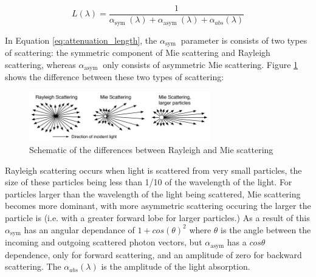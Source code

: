 \begin{equation}
L(\lambda)=\frac{1}{\alpha_{\text {sym }}(\lambda)+\alpha_{\text {asym }}(\lambda)+\alpha_{a b s}(\lambda)}
\label{eq:attenuation_length}
\end{equation}

In Equation \ref{eq:attenuation_length}, the $\alpha_{\text {sym }}$ parameter is consists of two types of scattering: the symmetric component of Mie scattering and Rayleigh scattering, whereas $\alpha_{\text {asym }}$ only consists of asymmetric Mie scattering.   Figure \ref{fig:rayleigh_mie} shows the difference between these two types of scattering:

\begin{figure}
    \includegraphics[width=0.7\textwidth]{Figures/rayleigh_mie.png}
    \caption{Schematic of the differences between Rayleigh and Mie scattering}
    \label{fig:rayleigh_mie}
\end{figure}

Rayleigh scattering occurs when light is scattered from very small particles, the size of these particles being less than 1/10 of the wavelength of the light. For particles larger than the wavelength of the light being scattered, Mie scattering becomes more dominant, with more asymmetric scattering occuring the larger the particle is (i.e. with a greater forward lobe for larger particles.) As a result of this $\alpha_{\text {sym}}$ has an angular dependance of $1 + cos(\theta)^2$ where $\theta$ is the angle between the incoming and outgoing scattered photon vectors, but $\alpha_{\text {asym}}$ has a $cos\theta$ dependence, only for forward scattering, and an amplitude of zero for backward scattering. The $\alpha_{abs}(\lambda)$ is the amplitude of the light absorption. 
